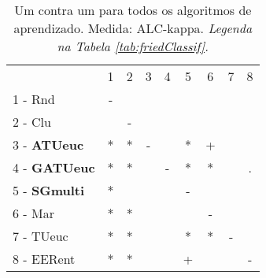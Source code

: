 \begin{table}[h]
\caption{Um contra um para todos os algoritmos de aprendizado. Medida: ALC-kappa. \textit{Legenda na Tabela \ref{tab:friedClassif}.}}
\begin{center}\begin{tabular}{lcc|cc|cc|cc}
 			& 1 & 2 & 3 & 4 & 5 & 6 & 7 & 8\\
1 - Rnd  	& - &   &   &   &   &   &   &   \\
2 - Clu  	&   & - &   &   &   &   &   &   \\ \hline
3 - \textbf{ATUeuc}	& * & * & - &   & * & + &   &   \\
4 - \textbf{GATUeuc}	& * & * &   & - & * & * &   & . \\ \hline
5 - \textbf{SGmulti}	& * &   &   &   & - &   &   &   \\
6 - Mar  	& * & * &   &   &   & - &   &   \\ \hline
7 - TUeuc	& * & * &   &   & * & * & - &   \\
8 - EERent	& * & * &   &   & + &   &   & - \\ \hline\end{tabular}
\label{stratsALCKappaFriedAllReduxall}
\end{center}
\end{table}